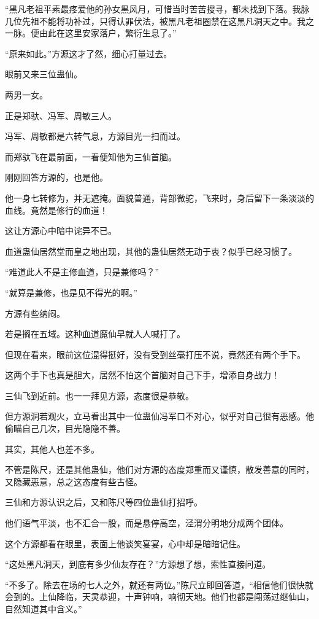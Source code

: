 \begin{this_body}
“黑凡老祖平素最疼爱他的孙女黑风月，可惜当时苦苦搜寻，都未找到下落。我脉几位先祖不能将功补过，只得认罪伏法，被黑凡老祖圈禁在这黑凡洞天之中。我之一脉。便由此在这里安家落户，繁衍生息了。”

“原来如此。”方源这才了然，细心打量过去。

眼前又来三位蛊仙。

两男一女。

正是郑驮、冯军、周敏三人。

冯军、周敏都是六转气息，方源目光一扫而过。

而郑驮飞在最前面，一看便知他为三仙首脑。

刚刚回答方源的，也是他。

他一身七转修为，并无遮掩。面貌普通，背部微驼，飞来时，身后留下一条淡淡的血线。竟然是修行的血道！

这让方源心中暗中诧异不已。

血道蛊仙居然堂而皇之地出现，其他的蛊仙居然无动于衷？似乎已经习惯了。

“难道此人不是主修血道，只是兼修吗？”

“就算是兼修，也是见不得光的啊。”

方源有些纳闷。

若是搁在五域。这种血道魔仙早就人人喊打了。

但现在看来，眼前这位混得挺好，没有受到丝毫打压不说，竟然还有两个手下。

这两个手下也真是胆大，居然不怕这个首脑对自己下手，增添自身战力！

三仙飞到近前。也一一拜见方源，态度很是恭敬。

但方源洞若观火，立马看出其中一位蛊仙冯军口不对心，似乎对自己很有恶感。他偷瞄自己几次，目光隐隐不善。

其实，其他人也差不多。

不管是陈尺，还是其他蛊仙，他们对方源的态度郑重而又谨慎，散发善意的同时，又隐藏恶意，总之这态度有些古怪。

三仙和方源认识之后，又和陈尺等四位蛊仙打招呼。

他们语气平淡，也不汇合一股，而是悬停高空，泾渭分明地分成两个团体。

这个方源都看在眼里，表面上他谈笑宴宴，心中却是暗暗记住。

“这处黑凡洞天，到底有多少仙友存在？”方源想了想，索性直接问道。

“不多了。除去在场的七人之外，就还有两位。”陈尺立即回答道，“相信他们很快就会到的。上仙降临，天灵恭迎，十声钟响，响彻天地。他们也都是闯荡过继仙山，自然知道其中含义。”


\end{this_body}
